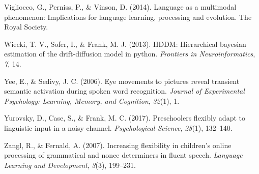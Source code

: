 \documentclass[,man,floatsintext]{apa6}
\begin{document}
\leavevmode\hypertarget{ref-vigliocco2014language}{}%
Vigliocco, G., Perniss, P., \& Vinson, D. (2014). Language as a multimodal phenomenon: Implications for language learning, processing and evolution. The Royal Society.

\leavevmode\hypertarget{ref-wiecki2013hddm}{}%
Wiecki, T. V., Sofer, I., \& Frank, M. J. (2013). HDDM: Hierarchical bayesian estimation of the drift-diffusion model in python. \emph{Frontiers in Neuroinformatics}, \emph{7}, 14.

\leavevmode\hypertarget{ref-yee2006eye}{}%
Yee, E., \& Sedivy, J. C. (2006). Eye movements to pictures reveal transient semantic activation during spoken word recognition. \emph{Journal of Experimental Psychology: Learning, Memory, and Cognition}, \emph{32}(1), 1.

\leavevmode\hypertarget{ref-yurovsky2017preschoolers}{}%
Yurovsky, D., Case, S., \& Frank, M. C. (2017). Preschoolers flexibly adapt to linguistic input in a noisy channel. \emph{Psychological Science}, \emph{28}(1), 132--140.

\leavevmode\hypertarget{ref-zangl2007increasing}{}%
Zangl, R., \& Fernald, A. (2007). Increasing flexibility in children's online processing of grammatical and nonce determiners in fluent speech. \emph{Language Learning and Development}, \emph{3}(3), 199--231.

\clearpage
\makeatletter
\efloat@restorefloats
\makeatother
\end{document}
